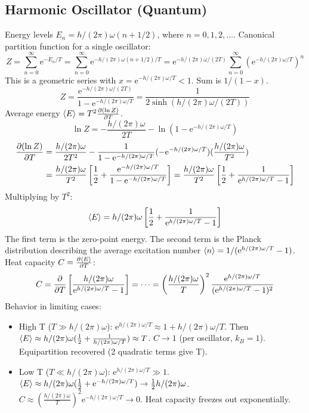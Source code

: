 \documentclass[10pt, letterpaper]{article}
\renewcommand{\hbar}{h/(2\pi)} %
\newcommand{\avg}[1]{\expval{#1}} %
\newcommand{\mathe}{\mathrm{e}} %
\begin{document}
\subsection{Harmonic Oscillator (Quantum)}
Energy levels $E_n = \hbar \omega (n + 1/2)$, where $n=0, 1, 2, \dots$.
Canonical partition function for a single oscillator:
\begin{equation*}
    Z = \sum_{n=0}^\infty \mathe^{-E_n / T} = \sum_{n=0}^\infty \mathe^{-\hbar \omega (n+1/2) / T} = \mathe^{-\hbar \omega / (2T)} \sum_{n=0}^\infty (\mathe^{-\hbar \omega / T})^n
\end{equation*}
This is a geometric series with $x = \mathe^{-\hbar \omega / T} < 1$. Sum is $1/(1-x)$.
\begin{equation}
    Z = \frac{\mathe^{-\hbar \omega / (2T)}}{1 - \mathe^{-\hbar \omega / T}} = \frac{1}{2 \sinh(\hbar \omega / (2T))}
\end{equation}
Average energy $\avg{E} = T^2 \pdv{(\ln Z)}{T}$.
\begin{equation*}
    \ln Z = -\frac{\hbar \omega}{2T} - \ln(1 - \mathe^{-\hbar \omega / T})
\end{equation*}
\begin{align*}
    \pdv{(\ln Z)}{T} &= \frac{\hbar \omega}{2T^2} - \frac{1}{1 - \mathe^{-\hbar \omega / T}} (-\mathe^{-\hbar \omega / T}) (\frac{\hbar \omega}{T^2}) \\
                    &= \frac{\hbar \omega}{T^2} \left[ \frac{1}{2} + \frac{\mathe^{-\hbar \omega / T}}{1 - \mathe^{-\hbar \omega / T}} \right] = \frac{\hbar \omega}{T^2} \left[ \frac{1}{2} + \frac{1}{\mathe^{\hbar \omega / T} - 1} \right]
\end{align*}
Multiplying by $T^2$:
\begin{equation}
    \avg{E} = \hbar \omega \left[ \frac{1}{2} + \frac{1}{\mathe^{\hbar \omega / T} - 1} \right]
\end{equation}
The first term is the zero-point energy. The second term is the Planck distribution describing the average excitation number $\avg{n} = 1/(\mathe^{\hbar \omega / T} - 1)$.
Heat capacity $C = \pdv{\avg{E}}{T}$:
\begin{equation}
    C = \pdv{}{T} \left[ \frac{\hbar \omega}{\mathe^{\hbar \omega / T} - 1} \right] = \dots = \left( \frac{\hbar \omega}{T} \right)^2 \frac{\mathe^{\hbar \omega / T}}{(\mathe^{\hbar \omega / T} - 1)^2}
\end{equation}
Behavior in limiting cases:
\begin{itemize}
    \item High T ($T \gg \hbar \omega$): $\mathe^{\hbar \omega / T} \approx 1 + \hbar \omega / T$. Then $\avg{E} \approx \hbar \omega (\frac{1}{2} + \frac{1}{\hbar \omega / T}) \approx T$. $C \to 1$ (per oscillator, $k_B=1$). Equipartition recovered (2 quadratic terms give T).
    \item Low T ($T \ll \hbar \omega$): $\mathe^{\hbar \omega / T} \gg 1$. $\avg{E} \approx \hbar \omega (\frac{1}{2} + \mathe^{-\hbar \omega / T}) \to \frac{1}{2}\hbar \omega$. $C \approx (\frac{\hbar \omega}{T})^2 \mathe^{-\hbar \omega / T} \to 0$. Heat capacity freezes out exponentially.
\end{itemize}
\end{document}
